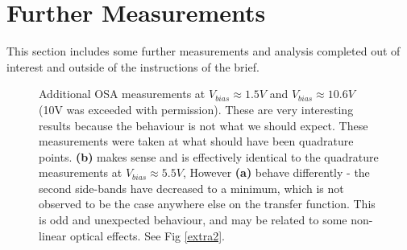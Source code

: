 \documentclass[12pt,a4paper]{report}
\begin{document}
\section{Further Measurements}
This section includes some further measurements and analysis completed out of interest and outside of the instructions of the brief.
\begin{figure}
    \centering
    \quad
    \caption{Additional OSA measurements at \textbf{$V_{bias}\approx 1.5V$} and \textbf{$V_{bias}\approx 10.6V$} (10V was exceeded with permission). These are very interesting results because the behaviour is not what we should expect. These measurements were taken at what should have been quadrature points. \textbf{(b)} makes sense and is effectively identical to the quadrature measurements at $V_{bias}\approx 5.5V$, However \textbf{(a)} behave differently - the second side-bands have decreased to a minimum, which is not observed to be the case anywhere else on the transfer function. This is odd and unexpected behaviour, and may be related to some non-linear optical effects. See Fig \ref{extra2}.}
    \label{extra1}
    \vspace{-12pt}
    \label{extra}
\end{figure}
\end{document}
